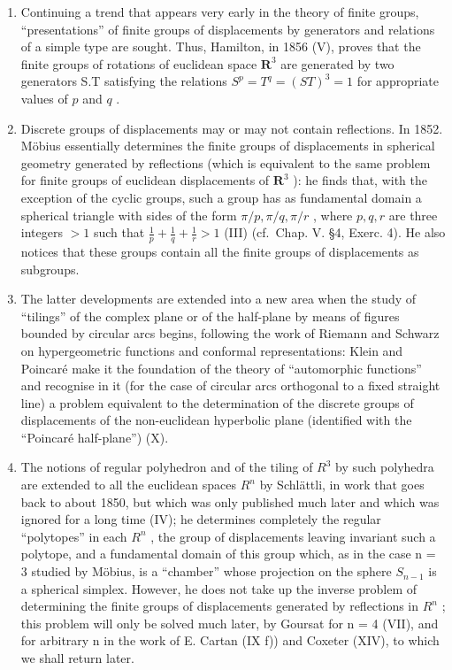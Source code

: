 \begin{enumerate}
\def\labelenumi{\arabic{enumi}.}
\item
  Continuing a trend that appears very early in the theory of finite groups, ``presentations'' of finite groups of displacements by generators and relations of a simple type are sought. Thus, Hamilton, in 1856 (V), proves that the finite groups of rotations of euclidean space \(\mathbf{R}^3\) are generated by two generators S.T satisfying the relations \(S^p = T^q = (ST)^3 = 1\) for appropriate values of \(p\) and \(q\) .
\item
  Discrete groups of displacements may or may not contain reflections. In 1852. Möbius essentially determines the finite groups of displacements in spherical geometry generated by reflections (which is equivalent to the same problem for finite groups of euclidean displacements of \(\mathbf{R}^3\) ): he finds that, with the exception of the cyclic groups, such a group has as fundamental domain a spherical triangle with sides of the form \(\pi / p, \pi / q, \pi / r\) , where \(p, q, r\) are three integers \(>1\) such that \(\frac{1}{p} + \frac{1}{q} + \frac{1}{r} > 1\) (III) (cf.~Chap. V. §4, Exerc. 4). He also notices that these groups contain all the finite groups of displacements as subgroups.
\item
  The latter developments are extended into a new area when the study of ``tilings'' of the complex plane or of the half-plane by means of figures bounded by circular arcs begins, following the work of Riemann and Schwarz on hypergeometric functions and conformal representations: Klein and Poincaré make it the foundation of the theory of ``automorphic functions'' and recognise in it (for the case of circular arcs orthogonal to a fixed straight line) a problem equivalent to the determination of the discrete groups of displacements of the non-euclidean hyperbolic plane (identified with the ``Poincaré half-plane'') (X).
\item
  The notions of regular polyhedron and of the tiling of \(R^{3}\) by such polyhedra are extended to all the euclidean spaces \(R^{n}\) by Schlättli, in work that goes back to about 1850, but which was only published much later and which was ignored for a long time (IV); he determines completely the regular ``polytopes'' in each \(R^{n}\) , the group of displacements leaving invariant such a polytope, and a fundamental domain of this group which, as in the case n = 3 studied by Möbius, is a ``chamber'' whose projection on the sphere \(S_{n-1}\) is a spherical simplex. However, he does not take up the inverse problem of determining the finite groups of displacements generated by reflections in \(R^{n}\) ; this problem will only be solved much later, by Goursat for n = 4 (VII), and for arbitrary n in the work of E. Cartan (IX f)) and Coxeter (XIV), to which we shall return later.
\end{enumerate}

